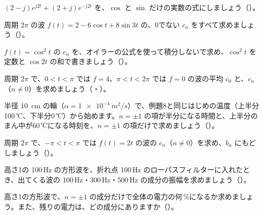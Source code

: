 \bkendproblems
{}

\bkproblem $(2-j)e^{j2t}+(2+j)e^{-j2t}$ を、$\cos$ と $\sin$ だけの実数の式にしましょう\mbox{（）}。

\bkproblem 周期 $2\pi$ の波 $f(t)=2-6\cos t+8\sin3t$ の、0でない $c_n$ をすべて求めましょう\mbox{（）}。

\bkproblem $f(t)=\cos^2t$ の $c_n$ を、オイラーの公式を使って積分しないで求め、$\cos^2t$ を定数と $\cos2t$ の和で書きましょう\mbox{（）}。

\bkproblem 周期 $2\pi$ で、$0<t<\pi$ では $f=4$、$\pi<t<2\pi$ では $f=0$ の波の平均 $c_0$ と、$c_n$（$n\neq0$）を求めましょう\mbox{（・）}。

\bkproblem 半径 \qty{10}{cm} の輪（$\alpha=\qty{1e-4}{m^2/s}$）で、例題8と同じはじめの温度（上半分100\,℃、下半分0\,℃）から始めます。$n=\pm1$ の項が半分になる時間と、上半分のまん中が60\,℃になる時刻を、$n=\pm1$ の項だけで求めましょう\mbox{（）}。


\bkproblem 周期 $2\pi$ で、$-\pi<t<\pi$ では $f(t)=2t$ の波の $c_n$（$n\neq0$）を求め、$b_n$ にもどしましょう\mbox{（）}。

\bkproblem 高さ1の 100\,Hz の方形波を、折れ点 100\,Hz のローパスフィルターに入れたとき、出てくる波の 100\,Hz・300\,Hz・500\,Hz の成分の振幅を求めましょう\mbox{（）}。

\bkproblem 高さ1の方形波で、$n=\pm1$ の成分だけで全体の電力の何\,\%になるか求めましょう。また、残りの電力は、どの成分にありますか\mbox{（）}。

